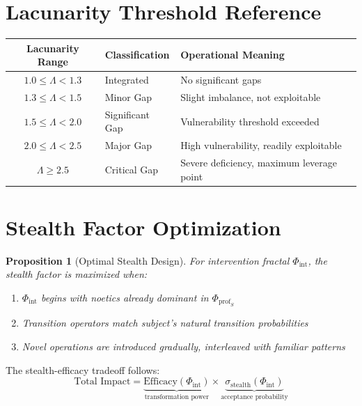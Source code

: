 \documentclass[11pt,twoside]{book}
\renewcommand{\arraystretch}{1.2}
\newcommand{\Lacunarity}{\Lambda}
\newcommand{\ManipFrac}{\Phi_{\mathrm{int}}}
\newcommand{\ProfileFrac}{\Phi_{\mathrm{prof}}}
\newcommand{\StealthFactor}{\sigma_{\mathrm{stealth}}}
\newtheorem{proposition}{Proposition}[chapter]
\begin{document}
\section{Lacunarity Threshold Reference}

\begin{center}
\renewcommand{\arraystretch}{1.3}
\begin{tabular}{c|l|l}
\toprule
\textbf{Lacunarity Range} & \textbf{Classification} & \textbf{Operational Meaning} \\
\midrule
$1.0 \leq \Lacunarity < 1.3$ & Integrated & No significant gaps \\
$1.3 \leq \Lacunarity < 1.5$ & Minor Gap & Slight imbalance, not exploitable \\
$1.5 \leq \Lacunarity < 2.0$ & Significant Gap & Vulnerability threshold exceeded \\
$2.0 \leq \Lacunarity < 2.5$ & Major Gap & High vulnerability, readily exploitable \\
$\Lacunarity \geq 2.5$ & Critical Gap & Severe deficiency, maximum leverage point \\
\bottomrule
\end{tabular}
\end{center}

\section{Stealth Factor Optimization}

\begin{proposition}[Optimal Stealth Design]
\label{prop:optimal-stealth}
For intervention fractal $\ManipFrac$, the stealth factor is maximized when:
\begin{enumerate}[label=(\roman*)]
    \item $\ManipFrac$ begins with noetics already dominant in $\ProfileFrac_S$
    \item Transition operators match subject's natural transition probabilities
    \item Novel operations are introduced gradually, interleaved with familiar patterns
\end{enumerate}
\end{proposition}

The stealth-efficacy tradeoff follows:
\[
    \text{Total Impact} = \underbrace{\text{Efficacy}(\ManipFrac)}_{\text{transformation power}}
    \times \underbrace{\StealthFactor(\ManipFrac)}_{\text{acceptance probability}}
\]

\appendix
\end{document}
